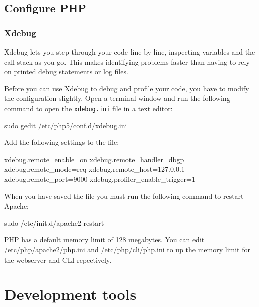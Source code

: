 \documentclass[ebook,10pt,twoside,openright]{memoir}
\begin{document}
\section{Configure PHP}

\subsection{Xdebug}

Xdebug lets you step through your code line by line, inspecting variables and the call stack as you go. This makes identifying problems faster than having to rely on printed debug statements or log files.

Before you can use Xdebug to debug and profile your code, you have to modify the configuration slightly. Open a terminal window and run the following command to open the \verb!xdebug.ini! file in a text editor:

\begin{squashboxcommand}
sudo gedit /etc/php5/conf.d/xdebug.ini
\end{squashboxcommand}

Add the following settings to the file:

\begin{squashboxoutput}
xdebug.remote_enable=on
xdebug.remote_handler=dbgp
xdebug.remote_mode=req
xdebug.remote_host=127.0.0.1
xdebug.remote_port=9000
xdebug.profiler_enable_trigger=1
\end{squashboxoutput}


When you have saved the file you must run the following command to restart Apache:

\begin{squashboxcommand}
sudo /etc/init.d/apache2 restart
\end{squashboxcommand}

PHP has a default memory limit of 128 megabytes. You can edit /etc/php/apache2/php.ini and /etc/php/cli/php.ini to up the memory limit for the webserver and CLI repectively.

\chapter{Development tools} \label{chdevtools}
\end{document}
